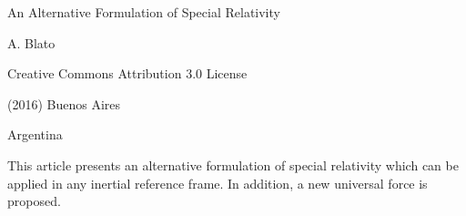 \documentclass[10pt,fleqn]{article}
\begin{document}
\begin{center}

{\fontsize{9.96}{9.96}\selectfont \sc An Alternative Formulation of Special Relativity}

\bigskip \medskip

{\fontsize{9.60}{9.60}\selectfont A. Blato}

\bigskip \medskip

\small

Creative Commons Attribution 3.0 License

\smallskip

(2016) Buenos Aires

\medskip

Argentina

\smallskip

\bigskip \medskip

\parbox{83.40mm}{This article presents an alternative formulation of special relativity which can be applied in any inertial reference frame. In addition, a new universal force is proposed.}

\end{center}

\normalsize

\vspace{-1.50em}

\par {}

\bigskip \smallskip
\end{document}
